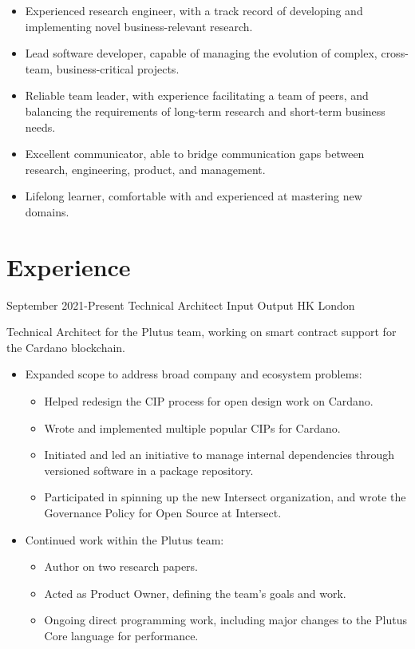 \documentclass[12pt,a4paper,sans]{moderncv}
\begin{document}
\maketitle

\begin{itemize}
  \item Experienced research engineer, with a track record of developing and implementing novel business-relevant research.
  \item Lead software developer, capable of managing the evolution of complex, cross-team, business-critical projects.
  \item Reliable team leader, with experience facilitating a team of peers, and balancing the requirements of long-term research and short-term business needs.
  \item Excellent communicator, able to bridge communication gaps between research, engineering, product, and management.
  \item Lifelong learner, comfortable with and experienced at mastering new domains.
\end{itemize}

\section{Experience}
\cventry
{September 2021-Present}
{Technical Architect}
{Input Output HK}
{London}
{}
{
  Technical Architect for the Plutus team, working on smart contract support for the Cardano blockchain.
  \begin{itemize}
    \item Expanded scope to address broad company and ecosystem problems:
    \begin{itemize}
      \item Helped redesign the CIP process for open design work on Cardano.
      \item Wrote and implemented multiple popular CIPs for Cardano.
      \item Initiated and led an initiative to manage internal dependencies through versioned software in a package repository.
      \item Participated in spinning up the new Intersect organization, and wrote the Governance Policy for Open Source at Intersect.
    \end{itemize}
    \item Continued work within the Plutus team:
    \begin{itemize}
      \item Author on two research papers.
      \item Acted as Product Owner, defining the team's goals and work.
      \item Ongoing direct programming work, including major changes to the Plutus Core language for performance.
    \end{itemize}
  \end{itemize}
}
\end{document}
